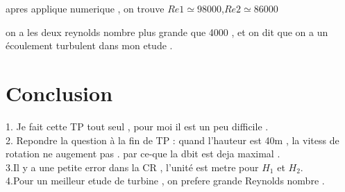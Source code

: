 \documentclass[a4paper,10pt]{report} %
\begin{document}
apres applique numerique , on trouve $Re1 \simeq 98000 $,$ Re2 \simeq 86000$

on a les deux reynolds nombre plus grande que 4000 , et on dit que on a un écoulement turbulent dans mon etude .

\chapter{Conclusion}

1. Je fait cette TP tout seul , pour moi il est un peu difficile .\\

2. Repondre la question à la fin de TP : quand l'hauteur est 40m , la vitess de rotation ne augement pas . par ce-que la dbit est deja maximal .\\

3.Il y a une petite error dans la CR , l'unité est metre pour $H_1$ et $ H_2$.\\

4.Pour un meilleur etude de turbine , on prefere grande Reynolds nombre .
\end{document}
